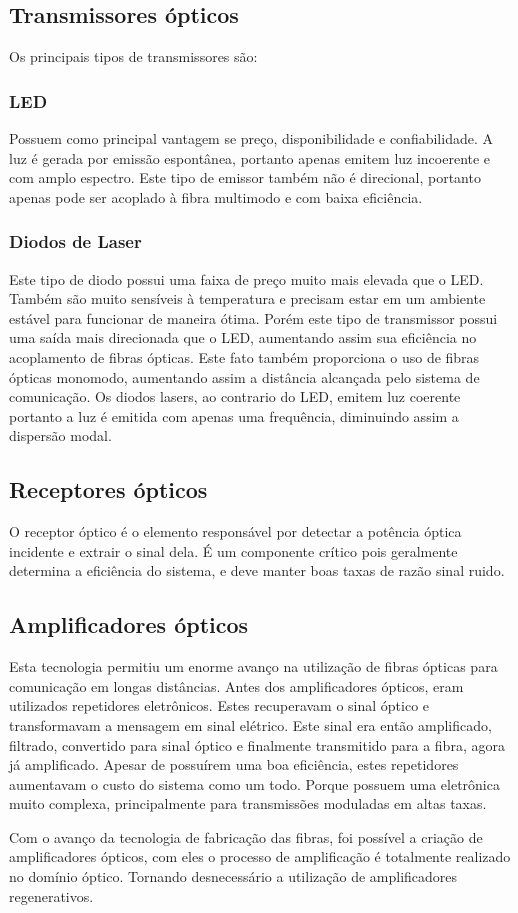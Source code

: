 \documentclass[article]{IEEEtran}
\begin{document}
\subsection{Transmissores ópticos}
Os principais tipos de transmissores são:
\subsubsection{LED}
Possuem como principal vantagem se preço, disponibilidade e confiabilidade. A luz é gerada por emissão espontânea, portanto apenas emitem luz incoerente e com amplo espectro. Este tipo de emissor também não é direcional, portanto apenas pode ser acoplado à fibra multimodo e com baixa eficiência.\cite{TRANSMITTERS}
\subsubsection{Diodos de Laser}
Este tipo de diodo possui uma faixa de preço muito mais elevada que o LED. Também são muito sensíveis à temperatura e precisam estar em um ambiente estável para funcionar de maneira ótima. 
Porém este tipo de transmissor possui uma saída mais direcionada que o LED, aumentando assim sua eficiência no acoplamento de fibras ópticas. Este fato também proporciona o uso de fibras ópticas monomodo, aumentando assim a distância alcançada pelo sistema de comunicação. Os diodos lasers, ao contrario do LED, emitem luz coerente portanto a luz é emitida com apenas uma frequência, diminuindo assim a dispersão modal. \cite{TRANSMITTERS}

\subsection{Receptores ópticos}
O receptor óptico é o elemento responsável por detectar a potência óptica incidente e extrair o sinal dela. É um componente crítico pois geralmente determina a eficiência do sistema, e deve manter boas taxas de razão sinal ruido.\cite{RECEIVER}
\subsection{Amplificadores ópticos}
\par Esta tecnologia permitiu um enorme avanço na utilização de fibras ópticas para comunicação em longas distâncias. Antes dos amplificadores ópticos, eram utilizados repetidores eletrônicos. Estes recuperavam o sinal óptico e transformavam a mensagem em sinal elétrico. Este sinal era então amplificado, filtrado, convertido para sinal óptico e finalmente transmitido para a fibra, agora já amplificado. Apesar de possuírem uma boa eficiência, estes repetidores aumentavam o custo do sistema como um todo. Porque possuem uma eletrônica muito complexa, principalmente para transmissões moduladas em altas taxas.
\par Com o avanço da tecnologia de fabricação das fibras, foi possível a criação de amplificadores ópticos, com eles o processo de amplificação é totalmente realizado no domínio óptico. Tornando desnecessário a utilização de amplificadores regenerativos.
\end{document}
